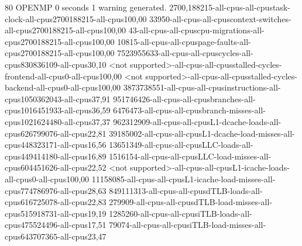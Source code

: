 
80
OPENMP
0 seconds
1 warning generated.
2700,188215-all-cpus-all-cpustask-clock-all-cpus2700188215-all-cpus100,00
33950-all-cpus-all-cpuscontext-switches-all-cpus2700188215-all-cpus100,00
43-all-cpus-all-cpuscpu-migrations-all-cpus2700188215-all-cpus100,00
10815-all-cpus-all-cpuspage-faults-all-cpus2700188215-all-cpus100,00
7523955633-all-cpus-all-cpuscycles-all-cpus830836109-all-cpus30,10
<not supported>-all-cpus-all-cpusstalled-cycles-frontend-all-cpus0-all-cpus100,00
<not supported>-all-cpus-all-cpusstalled-cycles-backend-all-cpus0-all-cpus100,00
3873738551-all-cpus-all-cpusinstructions-all-cpus1050362043-all-cpus37,91
951746426-all-cpus-all-cpusbranches-all-cpus1016451933-all-cpus36,59
6476473-all-cpus-all-cpusbranch-misses-all-cpus1021624480-all-cpus37,37
962312909-all-cpus-all-cpusL1-dcache-loads-all-cpus626799076-all-cpus22,81
39185002-all-cpus-all-cpusL1-dcache-load-misses-all-cpus448323171-all-cpus16,56
13651349-all-cpus-all-cpusLLC-loads-all-cpus449414180-all-cpus16,89
1516154-all-cpus-all-cpusLLC-load-misses-all-cpus604451626-all-cpus22,52
<not supported>-all-cpus-all-cpusL1-icache-loads-all-cpus0-all-cpus100,00
11158085-all-cpus-all-cpusL1-icache-load-misses-all-cpus774786976-all-cpus28,63
849111313-all-cpus-all-cpusdTLB-loads-all-cpus616725078-all-cpus22,83
279909-all-cpus-all-cpusdTLB-load-misses-all-cpus515918731-all-cpus19,19
1285260-all-cpus-all-cpusiTLB-loads-all-cpus475524496-all-cpus17,51
79074-all-cpus-all-cpusiTLB-load-misses-all-cpus643707365-all-cpus23,47
